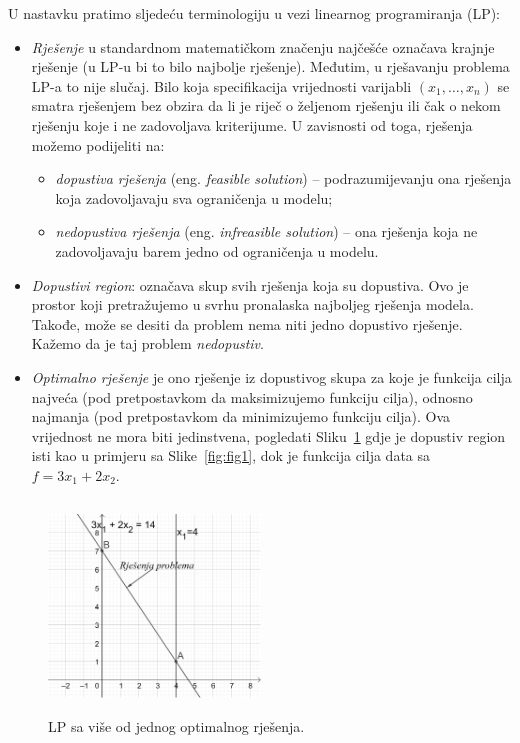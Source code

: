 \documentclass[a4paper, utf8, 11pt, colorlinks]{book}
\begin{document}
 U nastavku pratimo sljedeću terminologiju u vezi linearnog programiranja (LP):
\begin{itemize}
    \item \emph{Rješenje} u standardnom matematičkom značenju najčešće označava krajnje rješenje   (u LP-u bi to bilo najbolje rješenje). Međutim, u rješavanju problema LP-a to  nije slučaj. Bilo koja specifikacija vrijednosti varijabli  $(x_1,\ldots, x_n)$ se smatra rješenjem bez obzira da li je riječ o željenom rješenju ili čak o nekom rješenju koje i ne zadovoljava kriterijume. U zavisnosti od toga, rješenja  možemo podijeliti na:
    \begin{itemize}
        \item \emph{dopustiva rješenja} (eng. \emph{feasible solution}) -- podrazumijevanju ona rješenja koja zadovoljavaju sva ograničenja u modelu;
        \item \emph{nedopustiva rješenja} (eng. \emph{infreasible solution}) -- ona rješenja koja ne zadovoljavaju barem jedno od ograničenja u modelu. 
    \end{itemize}
  \item \emph{Dopustivi region}: označava skup svih rješenja koja su dopustiva. Ovo je prostor koji pretražujemo u svrhu pronalaska najboljeg rješenja modela. Takođe, može se desiti da problem nema niti jedno dopustivo rješenje. Kažemo da je taj problem \emph{nedopustiv}. 
  \item \emph{Optimalno rješenje} je ono rješenje iz dopustivog skupa za koje je funkcija cilja najveća (pod pretpostavkom da maksimizujemo funkciju cilja), odnosno najmanja (pod pretpostavkom da minimizujemo funkciju cilja). Ova vrijednost ne mora biti jedinstvena, pogledati Sliku~\ref{fig:multi_solution} gdje je dopustiv region isti kao u primjeru sa Slike~\ref{fig:fig1}, dok je funkcija cilja data sa $f = 3x_1 + 2 x_2$.  
 \end{itemize}
 
 \begin{figure}
     \centering
     \includegraphics[width=160pt, height=160pt]{fig3.eps}
     \caption{LP sa više od jednog optimalnog rješenja.}
     \label{fig:multi_solution}
 \end{figure}
 
\end{document}
